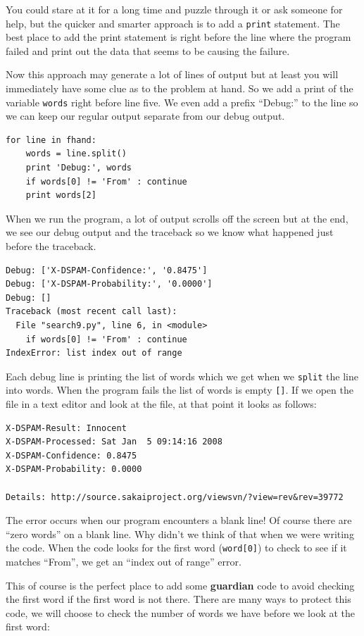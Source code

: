 \documentclass[10pt]{book}
\begin{document}
\begin{enumerate}
You could stare at it for a long time and puzzle through
it or ask someone for help, but the quicker and smarter
approach is to add a {\tt print} statement.  The best place
to add the print statement is right before the line where
the program failed and print out the data that seems to be causing
the failure.

Now this approach may generate a lot of lines of output but at 
least you will immediately have some clue as to the 
problem at hand.  So we add a print of the variable
{\tt words} right before line five.  We even 
add a prefix ``Debug:'' to the line so we can keep
our regular output separate from our debug output.

\beforeverb
\begin{verbatim}
for line in fhand:
    words = line.split()
    print 'Debug:', words
    if words[0] != 'From' : continue
    print words[2]
\end{verbatim}
\afterverb
%
When we run the program, a lot of output scrolls off the screen
but at the end, we see our debug output and the traceback so 
we know what happened just before the traceback.

\beforeverb
\begin{verbatim}
Debug: ['X-DSPAM-Confidence:', '0.8475']
Debug: ['X-DSPAM-Probability:', '0.0000']
Debug: []
Traceback (most recent call last):
  File "search9.py", line 6, in <module>
    if words[0] != 'From' : continue
IndexError: list index out of range
\end{verbatim}
\afterverb
%
Each debug line is printing the list of words which we get
when we {\tt split} the line into words.  When the program fails
the list of words is empty \verb"[]".  If we open the file in a text editor
and look at the file, at that point it looks as follows:

\beforeverb
\begin{verbatim}
X-DSPAM-Result: Innocent
X-DSPAM-Processed: Sat Jan  5 09:14:16 2008
X-DSPAM-Confidence: 0.8475
X-DSPAM-Probability: 0.0000

Details: http://source.sakaiproject.org/viewsvn/?view=rev&rev=39772
\end{verbatim}
\afterverb
%
The error occurs when our program encounters a blank line! Of course there
are ``zero words'' on a blank line.  Why didn't we think of that 
when we were writing the code.  When the code looks for the first
word (\verb"word[0]") to check to see if it matches ``From'', 
we get an ``index out of range'' error.

This of course is the perfect place to add some {\bf guardian} code 
to avoid checking the first word if the first word is not there.
There are many ways to protect this code, we will choose to 
check the number of words we have before we look at the first word:


\end{enumerate}
\end{document}
